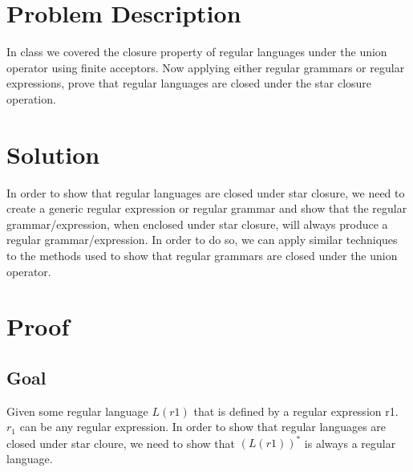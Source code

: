 \documentclass{assignment-x}
\begin{document}
\maketitle
\pagebreak

\section{Problem Description}
In class we covered the closure property of regular languages under the union operator using finite acceptors. Now applying either regular grammars or regular expressions, prove that regular languages are closed under the star closure operation.

\section{Solution}
In order to show that regular languages are closed under star closure, we need to create a generic regular expression or regular grammar and show that the regular grammar/expression, when enclosed under star closure, will always produce a regular grammar/expression. In order to do so, we can apply similar techniques to the methods used to show that regular grammars are closed under the union operator.

\section{Proof}
\subsection{Goal}
Given some regular language $L(r1)$  that is defined by a regular expression r1. 
$r_1$ can be any regular expression.
In order to show that regular languages are closed under star cloure, we need to show that $(L(r1))^*$ is always a regular language.
\end{document}
